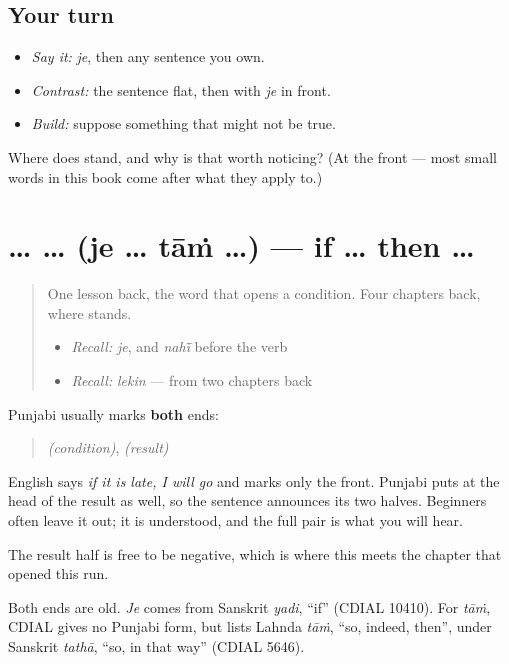 \subsection*{Your turn}
\begin{itemize}
\raggedright
  \item \emph{Say it:} \emph{je}, then any sentence you own.
  \item \emph{Contrast:} the sentence flat, then with \emph{je} in front.
  \item \emph{Build:} suppose something that might not be true.
\end{itemize}

\begin{tcolorbox}[breakable,colback=teal!4,colframe=teal!35!black,title={Before you move on}]
Where does \textbf{} stand, and why is that worth noticing? (At the front — most small words in this book come after what they apply to.)
\end{tcolorbox}
\section[\texorpdfstring{\pa{ਜੇ} … \pa{ਤਾਂ} … (je … tāṁ …)}{ਜੇ … ਤਾਂ … (je … tāṁ …)}]{ …  … (je … tāṁ …) — if … then …}

\label{lesson:PA-C41-je-tan}



\begin{quote}
One lesson back, the word that opens a condition. Four chapters back, where \textbf{} stands.

\begin{itemize}
\raggedright
  \item \emph{Recall:} \emph{je}, and \emph{nahī̃} before the verb
  \item \emph{Recall:} \emph{lekin} — from two chapters back
\end{itemize}
\end{quote}

\begin{cousinweb}
Punjabi usually marks \textbf{both} ends:

\begin{quote}
\textbf{} \emph{(condition)}, \textbf{} \emph{(result)}
\end{quote}

English says \emph{if it is late, I will go} and marks only the front. Punjabi puts \textbf{} at the head of the result as well, so the sentence announces its two halves. Beginners often leave it out; it is understood, and the full pair is what you will hear.

The result half is free to be negative, which is where this meets the chapter that opened this run.

Both ends are old. \emph{Je} comes from Sanskrit \emph{yadi}, \textquotedblleft{}if\textquotedblright{} (CDIAL 10410). For \emph{tāṁ}, CDIAL gives no Punjabi form, but lists Lahnda \emph{tāṁ}, \textquotedblleft{}so, indeed, then\textquotedblright{}, under Sanskrit \emph{tathā}, \textquotedblleft{}so, in that way\textquotedblright{} (CDIAL 5646).
\end{cousinweb}

